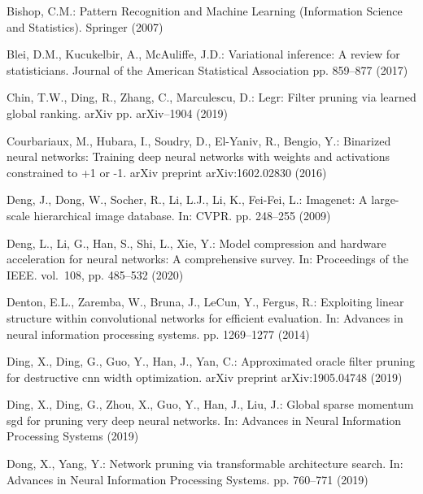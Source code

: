 \documentclass[runningheads, envcountsame, a4paper]{llncs}
\begin{document}
\begin{thebibliography}{10}
  \providecommand{\url}[1]{\texttt{#1}}
  \providecommand{\urlprefix}{URL }
  \providecommand{\doi}[1]{https://doi.org/#1}
  
  Bishop, C.M.: Pattern Recognition and Machine Learning (Information Science and
    Statistics). Springer (2007)
  
  Blei, D.M., Kucukelbir, A., McAuliffe, J.D.: Variational inference: A review
    for statisticians. Journal of the American Statistical Association pp.
    859--877 (2017)
  
  Chin, T.W., Ding, R., Zhang, C., Marculescu, D.: Legr: Filter pruning via
    learned global ranking. arXiv pp. arXiv--1904 (2019)
  
  Courbariaux, M., Hubara, I., Soudry, D., El-Yaniv, R., Bengio, Y.: Binarized
    neural networks: Training deep neural networks with weights and activations
    constrained to +1 or -1. arXiv preprint arXiv:1602.02830  (2016)
  
  Deng, J., Dong, W., Socher, R., Li, L.J., Li, K., Fei-Fei, L.: Imagenet: A
    large-scale hierarchical image database. In: CVPR. pp. 248--255 (2009)
  
  Deng, L., Li, G., Han, S., Shi, L., Xie, Y.: Model compression and hardware
    acceleration for neural networks: A comprehensive survey. In: Proceedings of
    the IEEE. vol.~108, pp. 485--532 (2020)
  
  Denton, E.L., Zaremba, W., Bruna, J., LeCun, Y., Fergus, R.: Exploiting linear
    structure within convolutional networks for efficient evaluation. In:
    Advances in neural information processing systems. pp. 1269--1277 (2014)
  
  Ding, X., Ding, G., Guo, Y., Han, J., Yan, C.: Approximated oracle filter
    pruning for destructive cnn width optimization. arXiv preprint
    arXiv:1905.04748  (2019)
  
  Ding, X., Ding, G., Zhou, X., Guo, Y., Han, J., Liu, J.: Global sparse momentum
    sgd for pruning very deep neural networks. In: Advances in Neural Information
    Processing Systems (2019)
  
  Dong, X., Yang, Y.: Network pruning via transformable architecture search. In:
    Advances in Neural Information Processing Systems. pp. 760--771 (2019)
  

\end{thebibliography}
\end{document}
